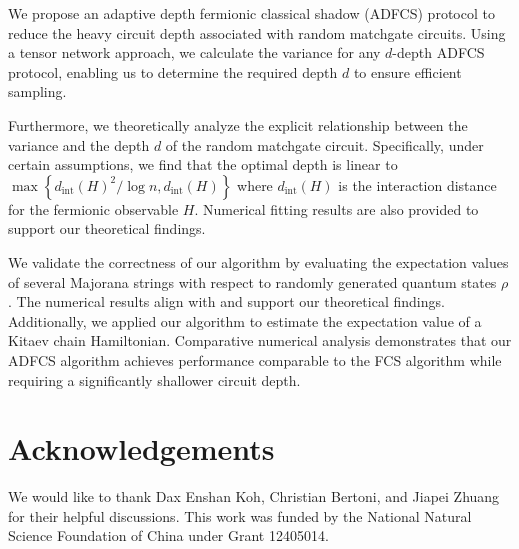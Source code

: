 \documentclass[showpacs,onecolumn,aps,prx,long bibliography,superscriptaddress,notitlepage]{revtex4-1}
\begin{document}
We propose an adaptive depth fermionic classical shadow (ADFCS) protocol to reduce the heavy circuit depth associated with random matchgate circuits. Using a tensor network approach, we calculate the variance for any $d$-depth ADFCS protocol, enabling us to determine the required depth $d$ to ensure efficient sampling. 

Furthermore, we theoretically analyze the explicit relationship between the variance and the depth $d$ of the random matchgate circuit. Specifically, under certain assumptions, we find that the optimal depth is linear to $\max\left\{{d_{\text{int}}(H)^2}/{\log n}, d_{\text{int}}(H)\right\}$ where $d_{\text{int}}(H)$ is the interaction distance for the fermionic observable $H$. Numerical fitting results are also provided to support our theoretical findings.

We validate the correctness of our algorithm by evaluating the expectation values of several Majorana strings with respect to randomly generated quantum states $\rho$. The numerical results align with and support our theoretical findings. Additionally, we applied our algorithm to estimate the expectation value of a Kitaev chain Hamiltonian. Comparative numerical analysis demonstrates that our ADFCS algorithm achieves performance comparable to the FCS algorithm while requiring a significantly shallower circuit depth.


\section*{Acknowledgements}
 We would like to thank Dax Enshan Koh, Christian Bertoni, {and Jiapei Zhuang} for their helpful discussions.
This work was funded by the National Natural Science Foundation of China under Grant 12405014.



% 
\end{document}

